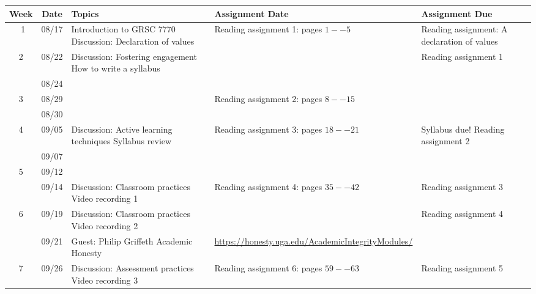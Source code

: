 \begin{longtable}{ |c|c|p{10em}|p{10em}|p{10em}| }
  \hline
  \textbf{Week} & \textbf{Date} & \textbf{Topics} & \textbf{Assignment Date} & \textbf{Assignment Due} \\
  \hline\ 
  1 & 08/17 & {Introduction to GRSC 7770 Discussion: Declaration of values} 
            & {Reading assignment 1:  pages $1--5$}
            & {Reading assignment:  A declaration of values} \\  \hline
  
  2 & 08/22 &  {Discussion: Fostering engagement How to write a syllabus}
            &
            & {Reading assignment 1}  \\ \hline
  
    & 08/24 &  {} & & {}  \\ \hline

  3 & 08/29 & 
            & {Reading assignment 2: pages $8--15$} 
            & \\ \hline

    & 08/30 &  {} & & {} \\ \hline

  4 & 09/05 &  {Discussion: Active learning techniques Syllabus review} 
            & {Reading assignment 3: pages $18--21$} 
            & {Syllabus due! Reading assignment 2}\\ \hline

    & 09/07 &  {} & {} & {}\\ \hline


  5 & 09/12 & {} 
            & {} 
            & \\ \hline %
  
    & 09/14 &  {Discussion: Classroom practices Video recording 1} 
            & {Reading assignment 4: pages $35--42$} 
            & {Reading assignment 3} \\ \hline

  6 & 09/19 &  {Discussion:  Classroom practices Video recording 2} 
            &  
            & {Reading assignment 4}\\ \hline

    & 09/21 &  {Guest: Philip Griffeth Academic Honesty}  & \url{https://honesty.uga.edu/AcademicIntegrityModules/} & {} \\ \hline

  7 & 09/26 &  {Discussion: Assessment practices Video recording 3} 
            & {Reading assignment 6: pages $59--63$} 
            & {Reading assignment 5} \\ \hline


\end{longtable}
